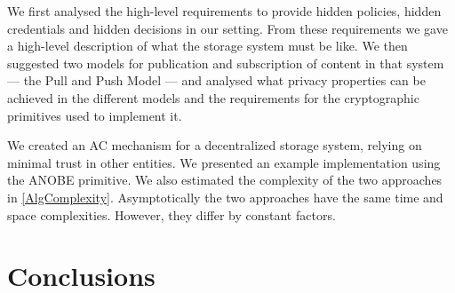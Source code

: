 
We first analysed the high-level requirements to provide hidden policies, 
hidden credentials and hidden decisions in our setting.
From these requirements we gave a high-level description of what the storage 
system must be like.
We then suggested two models for publication and subscription of content in 
that system --- the Pull and Push Model --- and analysed what privacy 
properties can be achieved in the different models and the requirements for the 
cryptographic primitives used to implement it.

We created an \ac{AC} mechanism for a decentralized storage system, relying on 
minimal trust in other entities.
We presented an example implementation using the \ac{ANOBE} primitive.
We also estimated the complexity of the two approaches in 
\cref{AlgComplexity}.
Asymptotically the two approaches have the same time and space complexities.
However, they differ by constant factors.


\section{Conclusions}\label{sec:Conclusions}



